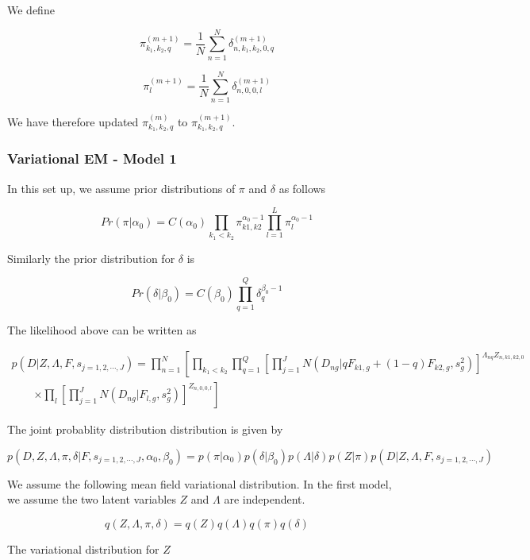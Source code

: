 \documentclass[11pt,authoryear]{article}
\begin{document}
We define 

$$ \pi^{(m+1)}_{k_1, k_2, q} = \frac{1}{N}\sum_{n=1}^{N} \delta^{(m+1)}_{n, k_1, k_2, 0, q} $$

$$ \pi^{(m+1)}_{l} = \frac{1}{N}\sum_{n=1}^{N} \delta^{(m+1)}_{n, 0, 0, l} $$

We have therefore updated $\pi^{(m)}_{k_1, k_2, q}$ to $\pi^{(m+1)}_{k_1, k_2, q}$.


\subsubsection{Variational EM  - Model 1}

In this set up, we assume prior distributions of $\pi$ and $\delta$ as follows

$$ Pr (\pi | \alpha_{0}) = C (\alpha_0) \prod_{k_1 < k_2} \pi_{k1, k2}^{\alpha_0 -1} \prod_{l=1}^{L} \pi_{l}^{\alpha_0 -1}$$

Similarly the prior distribution for $\delta$ is 

$$ Pr (\delta | \beta_0) = C (\beta_0) \prod_{q=1}^{Q} \delta_{q}^{\beta_0 -1 }  $$

The likelihood above can be written as 

\begin{multline}
p (D | Z, \Lambda, F, s_{j=1,2,\cdots,J}) = \prod_{n=1}^{N} \left [ \prod_{k_1 < k_2} \prod_{q=1}^{Q} \left [ \prod_{j=1}^{J} N (D_{ng} | qF_{k1,g} + (1-q)F_{k2,g}, s^2_{g}) \right ]^{\Lambda_{nq}Z_{n, k1, k2, 0}}   \right. \\
\qquad \left. \times \prod_{l} \left [ \prod_{j=1}^{J} N (D_{ng} | F_{l,g}, s^2_{g}) \right ]^{Z_{n, 0, 0, l}} \right] 
\end{multline}

The joint probablity distribution distribution is given by 

$$ p (D, Z, \Lambda, \pi, \delta | F, s_{j=1,2,\cdots,J}, \alpha_{0}, \beta_{0}) = p (\pi | \alpha_0) p (\delta | \beta_0)  p (\Lambda | \delta) p (Z | \pi) p (D | Z, \Lambda, F, s_{j=1,2,\cdots,J})  $$


We assume the following mean field variational distribution. In the first model, we assume the two latent variables $Z$ and $\Lambda$ are independent. 

$$ q(Z, \Lambda, \pi, \delta) = q(Z) q(\Lambda) q(\pi) q(\delta) $$

The variational distribution for $Z$
\end{document}
